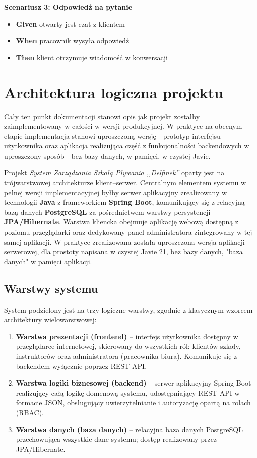 \documentclass[a4paper,12pt]{article}
\begin{document}
\textbf{Scenariusz 3: Odpowiedź na pytanie}
\begin{itemize}
    \item \textbf{Given} otwarty jest czat z klientem
    \item \textbf{When} pracownik wysyła odpowiedź
    \item \textbf{Then} klient otrzymuje wiadomość w konwersacji
\end{itemize}

\section{Architektura logiczna projektu}
 
Cały ten punkt dokumentacji stanowi opis jak projekt zostałby zaimplementowany w całości w wersji produkcyjnej. W praktyce na obecnym etapie implementacja stanowi uproszczoną wersję - prototyp interfejsu użytkownika oraz aplikacja realizująca część z funkcjonalności backendowych w uproszczony sposób - bez bazy danych, w pamięci, w czystej Javie.

Projekt \textit{System Zarządzania Szkołą Pływania ,,Delfinek''} oparty jest na trójwarstwowej architekturze klient--serwer. Centralnym elementem systemu w pełnej wersji implementacyjnej byłby serwer aplikacyjny zrealizowany w technologii \textbf{Java} z frameworkiem \textbf{Spring Boot}, komunikujący się z relacyjną bazą danych \textbf{PostgreSQL} za pośrednictwem warstwy persystencji \textbf{JPA/Hibernate}. Warstwa kliencka obejmuje aplikację webową dostępną z poziomu przeglądarki oraz dedykowany panel administratora zintegrowany w tej samej aplikacji. W praktyce zrealizowana została uproszczona wersja aplikacji serwerowej, dla prostoty napisana w czystej Javie 21, bez bazy danych, "baza danych" w pamięci aplikacji.
 
\subsection{Warstwy systemu}
 
System podzielony jest na trzy logiczne warstwy, zgodnie z klasycznym wzorcem architektury wielowarstwowej:
 
\begin{enumerate}
    \item \textbf{Warstwa prezentacji (frontend)} -- interfejs użytkownika dostępny w przeglądarce internetowej, skierowany do wszystkich ról: klientów szkoły, instruktorów oraz administratora (pracownika biura). Komunikuje się z backendem wyłącznie poprzez REST API.
    \item \textbf{Warstwa logiki biznesowej (backend)} -- serwer aplikacyjny Spring Boot realizujący całą logikę domenową systemu, udostępniający REST API w formacie JSON, obsługujący uwierzytelnianie i autoryzację opartą na rolach (RBAC).
    \item \textbf{Warstwa danych (baza danych)} -- relacyjna baza danych PostgreSQL przechowująca wszystkie dane systemu; dostęp realizowany przez JPA/Hibernate.
\end{enumerate}
 
\end{document}
